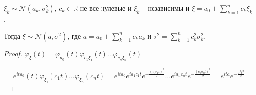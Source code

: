 \begin{theorem}
    $\xi_k \sim \mathcal{N} (a_k, \sigma_k^2)$, $c_k \in \mathbb{R}$ не все нулевые и $\xi_k$ -- независимы и $\xi = a_0 + \sum_{k = 1}^n c_k \xi_k$.

    Тогда $\xi \sim \mathcal{N} (a, \sigma^2)$, где
    $a = a_0 + \sum_{k = 1}^n c_k a_k$ и $\sigma^2 = \sum_{k = 1}^n c_k^2 \sigma_k^2$.
\end{theorem}

\begin{proof}
    $\varphi_{\xi} (t) = \varphi_{a_0} (t) \varphi_{c_1\xi_1} (t) \ldots \varphi_{c_n\xi_n} (t) = $

    $=  e^{ita_0} (t) \varphi_{\xi_1} (c_1t) \ldots \varphi_{\xi_n} (c_nt) = 
    e^{ita_0} e^{ia_1c_1 t} e^{- \frac{(c_1 \sigma_1 t)^2}{2}} \ldots e^{ia_nc_n t} e^{- \frac{(c_n \sigma_n t)^2}{2}} =
    e^{ita} e^{- \frac{\sigma^2t^2}{2}} $
\end{proof}


